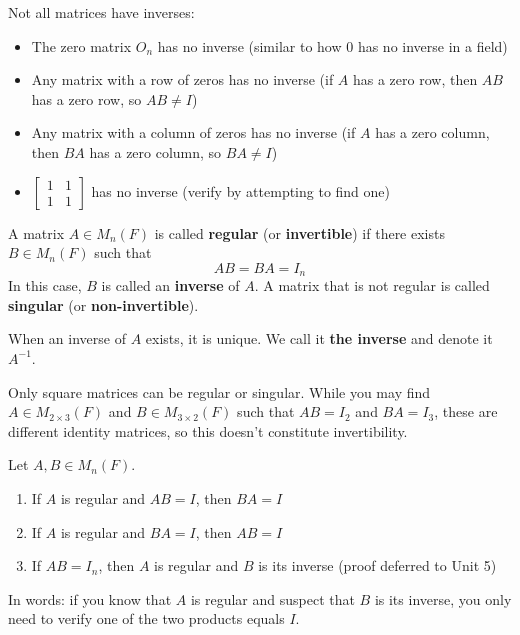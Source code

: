\begin{note}
    Not all matrices have inverses:
    \begin{itemize}
        \item The zero matrix $O_n$ has no inverse (similar to how $0$ has no inverse in a field)
        \item Any matrix with a row of zeros has no inverse (if $A$ has a zero row, then $AB$ has a zero row, so $AB \neq I$)
        \item Any matrix with a column of zeros has no inverse (if $A$ has a zero column, then $BA$ has a zero column, so $BA \neq I$)
        \item $\begin{bmatrix} 1 & 1 \\ 1 & 1 \end{bmatrix}$ has no inverse (verify by attempting to find one)
    \end{itemize}
\end{note}

\begin{definition}\label{def:regular-singular}
    A matrix $A \in M_n(F)$ is called \textbf{regular} (or \textbf{invertible}) if there exists $B \in M_n(F)$ such that
    \[
    AB = BA = I_n
    \]
    In this case, $B$ is called an \textbf{inverse} of $A$. A matrix that is not regular is called \textbf{singular} (or \textbf{non-invertible}).
\end{definition}

\begin{notation}
    When an inverse of $A$ exists, it is unique. We call it \textbf{the inverse} and denote it $A^{-1}$.
\end{notation}

\begin{note}
    Only square matrices can be regular or singular. While you may find $A \in M_{2 \times 3}(F)$ and $B \in M_{3 \times 2}(F)$ such that $AB = I_2$ and $BA = I_3$, these are different identity matrices, so this doesn't constitute invertibility.
\end{note}

\begin{theorem}\label{thm:one-sided-inverse}
    Let $A, B \in M_n(F)$.
    \begin{enumerate}[label=(\roman*)]
        \item If $A$ is regular and $AB = I$, then $BA = I$
        \item If $A$ is regular and $BA = I$, then $AB = I$
        \item If $AB = I_n$, then $A$ is regular and $B$ is its inverse (proof deferred to Unit 5)
    \end{enumerate}
    In words: if you know that $A$ is regular and suspect that $B$ is its inverse, you only need to verify one of the two products equals $I$.
\end{theorem}

